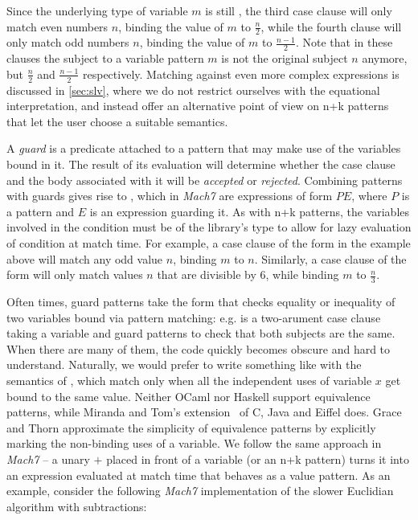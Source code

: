Since the underlying type of variable $m$ is still , the third case 
clause will only match even numbers $n$, binding the value of $m$ to 
$\frac{n}{2}$, while the fourth clause will only match odd numbers $n$, binding 
the value of $m$ to $\frac{n-1}{2}$.  Note that in these clauses the subject to  
a variable pattern $m$ is not the original subject $n$ anymore, but 
$\frac{n}{2}$ and $\frac{n-1}{2}$ respectively. Matching against even more 
complex expressions is discussed in \textsection\ref{sec:slv}, where we do not 
restrict ourselves with the equational interpretation, and instead offer an alternative 
point of view on n+k patterns that let the user choose a suitable semantics.  

A \emph{guard} is a predicate attached to a pattern that may make use of the 
variables bound in it. The result of its evaluation will determine whether the 
case clause and the body associated with it will be \emph{accepted} or 
\emph{rejected}. Combining patterns with guards gives rise to , which in \emph{Mach7} are expressions of form $P$\code{|=}$E$, where $P$ is a 
pattern and $E$ is an expression guarding it. As with n+k patterns, the variables 
involved in the condition must be of the library's type  to allow 
for lazy evaluation of condition at match time. For example, a case clause of 
the form  in  the example above will match any odd value 
$n$, binding $m$ to $n$. Similarly, a case clause of the form  
will only match values $n$ that are divisible by 6, while binding $m$ to $\frac{n}{3}$.

Often times, guard patterns take the form that checks equality or inequality of 
two variables bound via pattern matching: e.g.  is 
a two-arument case clause taking a variable and guard patterns to check that 
both subjects are the same. 
When there are many of them, the code quickly becomes obscure and hard to 
understand. Naturally, we would prefer to write something like  
with the semantics of , which match only when all the 
independent uses of variable $x$ get bound to the same value. 
Neither OCaml nor Haskell support equivalence patterns, while Miranda and Tom's 
extension~\cite{Moreau:2003} of C, Java and Eiffel does. Grace and Thorn 
approximate the simplicity of equivalence patterns by explicitly marking the 
non-binding uses of a variable. We follow the same approach in \emph{Mach7} -- a unary 
$+$ placed in front of a variable (or an n+k pattern) turns it into an 
expression evaluated at match time that behaves as a value pattern. As an 
example, consider the following \emph{Mach7} implementation of the slower 
Euclidian algorithm with subtractions:

